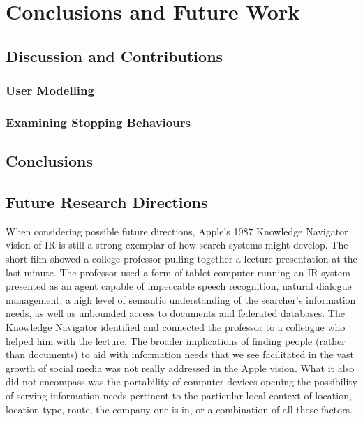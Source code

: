 
\chapter{Conclusions and Future Work}\label{chap:conclusions}
\section{Discussion and Contributions}

\subsection{User Modelling}
\subsection{Examining Stopping Behaviours}

\section{Conclusions}

\section{Future Research Directions}


When considering possible future directions, Apple’s 1987 Knowledge Navigator vision of IR is still a strong exemplar of how search systems might develop. The short film showed a college professor pulling together a lecture presentation at the last minute. The professor used a form of tablet computer running an IR system presented as an agent capable of impeccable speech recognition, natural dialogue management, a high level of semantic understanding of the searcher’s information needs, as well as unbounded access to documents and federated databases.
The Knowledge Navigator identified and connected the professor to a colleague who helped him with the lecture. The broader implications of finding people (rather than documents) to aid with information needs that we see facilitated in the vast growth of social media was not really addressed in the Apple vision. What it also did not encompass was the portability of computer devices opening the possibility of serving information needs pertinent to the particular local context of location, location type, route, the company one is in, or a combination of all these factors. 